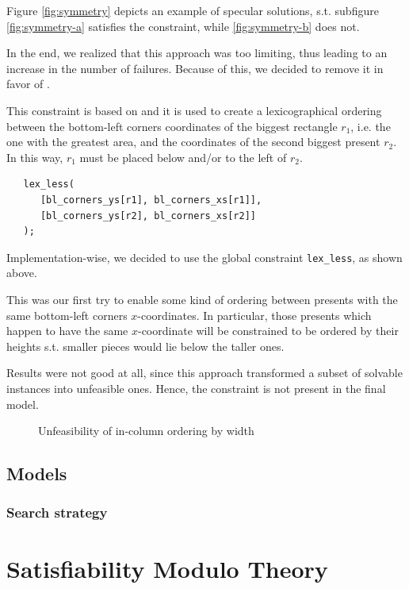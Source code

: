\documentclass[a4paper,10pt]{article}
\newcounter{subsubsubsection}[subsubsection]
\begin{document}
Figure \ref{fig:symmetry} depicts an example of specular solutions, s.t. subfigure \ref{fig:symmetry-a} satisfies the constraint, while \ref{fig:symmetry-b} does not.

In the end, we realized that this approach was too limiting, thus leading to an increase in the number of failures. Because of this, we decided to remove it in favor of .

 \label{sec:areas-ordering}
This constraint is based on \cite{sweep} and it is used to create a lexicographical ordering between the bottom-left corners coordinates of the biggest rectangle $r_{1}$, i.e. the one with the greatest area, and the coordinates of the second biggest present $r_{2}$.
In this way, $r_{1}$ must be placed below and/or to the left of $r_{2}$. 

\begin{verbatim}
   lex_less(
      [bl_corners_ys[r1], bl_corners_xs[r1]], 
      [bl_corners_ys[r2], bl_corners_xs[r2]]
   );
\end{verbatim}

Implementation-wise, we decided to use the global constraint \texttt{lex\_less}, as shown above.

 \label{sec:width-ordering}
This was our first try to enable some kind of ordering between presents with the same bottom-left corners $x$-coordinates.
In particular, those presents which happen to have the same $x$-coordinate will be constrained to be ordered by their heights s.t. smaller pieces would lie below the taller ones.

Results were not good at all, since this approach transformed a subset of solvable instances into unfeasible ones. Hence, the constraint is not present in the final model.

\begin{figure}[h]
   \centering
   \caption{Unfeasibility of in-column ordering by width}
   \label{fig:col-stacking}
\end{figure}


\subsection{Models}

\subsubsection*{Search strategy}

\section{Satisfiability Modulo Theory}

\printbibliography
\end{document}
